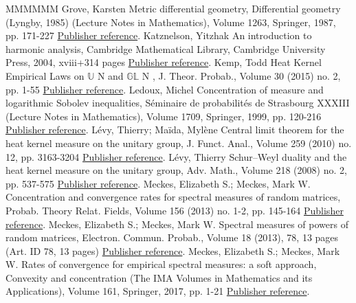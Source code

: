 \documentclass[11pt]{article}
\theoremstyle{definition}
\numberwithin{equation}{section}
\numberwithin{figure}{section}
\numberwithin{table}{section}
\begin{document}
\begin{thebibliography}{MMMMMM}
 Grove, Karsten Metric differential geometry, Differential geometry (Lyngby, 1985) (Lecture Notes in Mathematics), Volume 1263, Springer, 1987, pp. 171-227 \href{https://ahl.centre-mersenne.org/item/AHL_2018__1__247_0/#Grove1987}{Publisher reference}.
 Katznelson, Yitzhak An introduction to harmonic analysis, Cambridge Mathematical Library, Cambridge University Press, 2004, xviii+314 pages \href{https://ahl.centre-mersenne.org/item/AHL_2018__1__247_0/#Katznelson2004}{Publisher reference}.
 Kemp, Todd Heat Kernel Empirical Laws on \ensuremath{\mathbb{U}} N  and \ensuremath{\mathbb{G}}\ensuremath{\mathbb{L}} N , J. Theor. Probab., Volume 30 (2015) no. 2, pp. 1-55 \href{https://ahl.centre-mersenne.org/item/AHL_2018__1__247_0/#Kemp2015}{Publisher reference}.
 Ledoux, Michel Concentration of measure and logarithmic Sobolev inequalities, Séminaire de probabilités de Strasbourg XXXIII (Lecture Notes in Mathematics), Volume 1709, Springer, 1999, pp. 120-216 \href{https://ahl.centre-mersenne.org/item/AHL_2018__1__247_0/#Ledoux1999}{Publisher reference}.
 Lévy, Thierry; Maïda, Mylène Central limit theorem for the heat kernel measure on the unitary group, J. Funct. Anal., Volume 259 (2010) no. 12, pp. 3163-3204 \href{https://ahl.centre-mersenne.org/item/AHL_2018__1__247_0/#LevyMaida2010}{Publisher reference}.
 Lévy, Thierry Schur–Weyl duality and the heat kernel measure on the unitary group, Adv. Math., Volume 218 (2008) no. 2, pp. 537-575 \href{https://ahl.centre-mersenne.org/item/AHL_2018__1__247_0/#Levy2008}{Publisher reference}.
 Meckes, Elizabeth S.; Meckes, Mark W. Concentration and convergence rates for spectral measures of random matrices, Probab. Theory Relat. Fields, Volume 156 (2013) no. 1-2, pp. 145-164 \href{https://ahl.centre-mersenne.org/item/AHL_2018__1__247_0/#MM-PTRF-2013}{Publisher reference}.
 Meckes, Elizabeth S.; Meckes, Mark W. Spectral measures of powers of random matrices, Electron. Commun. Probab., Volume 18 (2013), 78, 13 pages (Art. ID 78, 13 pages) \href{https://ahl.centre-mersenne.org/item/AHL_2018__1__247_0/#MM-ECP-2013}{Publisher reference}.
 Meckes, Elizabeth S.; Meckes, Mark W. Rates of convergence for empirical spectral measures: a soft approach, Convexity and concentration (The IMA Volumes in Mathematics and its Applications), Volume 161, Springer, 2017, pp. 1-21 \href{https://ahl.centre-mersenne.org/item/AHL_2018__1__247_0/#MM2016}{Publisher reference}.

\end{thebibliography}
\end{document}
